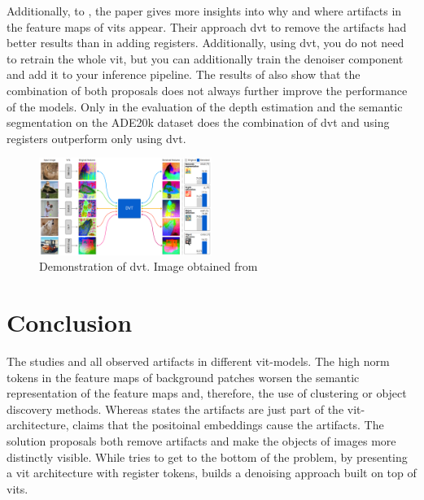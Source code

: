 \documentclass[conference]{IEEEtran}
\begin{document}
  Additionally, to \cite{registers}, the paper gives more insights into why and where artifacts in the feature maps of \acp{vit} appear. Their approach \ac{dvt} to remove the artifacts had better results than in \cite{registers} adding registers. Additionally, using \ac{dvt}, you do not need to retrain the whole \ac{vit}, but you can additionally train the denoiser component and add it to your inference pipeline. The results of \cite{denoising} also show that the combination of both proposals does not always further improve the performance of the models. Only in the evaluation of the depth estimation and the semantic segmentation on the ADE20k dataset does the combination of \ac{dvt} and using registers outperform only using \ac{dvt}. \cite{denoising}
 
  \begin{figure}
    \centering
    \includegraphics[width=0.5\textwidth]{figures/artifacts-positions.png}
    \caption{Demonstration of \ac{dvt}. Image obtained from \cite{denoising}}
    \label{fig:artifacts-positions}
  \end{figure}

  \section{Conclusion}
  \label{sec:conclusion}

  The studies \cite{registers} \cite{mamba-needs-registers} and \cite{denoising} all observed artifacts in different \ac{vit}-models. The high norm tokens in the feature maps of background patches worsen the semantic representation of the feature maps and, therefore, the use of clustering or object discovery methods. Whereas \cite{registers} states the artifacts are just part of the \ac{vit}-architecture, \cite{denoising} claims that the positoinal embeddings cause the artifacts. The solution proposals both remove artifacts and make the objects of images more distinctly visible. While \cite{registers} tries to get to the bottom of the problem, by presenting a \ac{vit} architecture with register tokens, \cite{denoising} builds a denoising approach built on top of \acp{vit}. 
  
\end{document}

